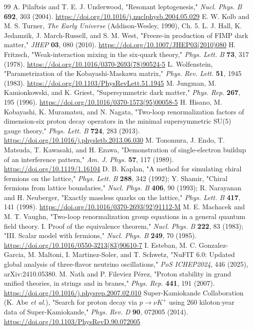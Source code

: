 \documentclass[aps,prd,amsmath,amssymb,superscriptaddress,longbibliography,floatfix,preprint]{revtex4-2}
\begin{document}
\begin{thebibliography}{99}
 A. Pilaftsis and T. E. J. Underwood, "Resonant leptogenesis," \emph{Nucl. Phys. B} \textbf{692}, 303 (2004). \url{https://doi.org/10.1016/j.nuclphysb.2004.05.029}
 E. W. Kolb and M. S. Turner, \emph{The Early Universe} (Addison-Wesley, 1990), Ch. 5.
 L. J. Hall, K. Jedamzik, J. March-Russell, and S. M. West, "Freeze-in production of FIMP dark matter," \emph{JHEP} \textbf{03}, 080 (2010). \url{https://doi.org/10.1007/JHEP03(2010)080}
 H. Fritzsch, "Weak-interaction mixing in the six-quark theory," \emph{Phys. Lett. B} \textbf{73}, 317 (1978). \url{https://doi.org/10.1016/0370-2693(78)90524-5}
 L. Wolfenstein, "Parametrization of the Kobayashi-Maskawa matrix," \emph{Phys. Rev. Lett.} \textbf{51}, 1945 (1983). \url{https://doi.org/10.1103/PhysRevLett.51.1945}
 M. Jungman, M. Kamionkowski, and K. Griest, "Supersymmetric dark matter," \emph{Phys. Rep.} \textbf{267}, 195 (1996). \url{https://doi.org/10.1016/0370-1573(95)00058-5}
 H. Hisano, M. Kobayashi, K. Muramatsu, and N. Nagata, "Two-loop renormalization factors of dimension-six proton decay operators in the minimal supersymmetric SU(5) gauge theory," \emph{Phys. Lett. B} \textbf{724}, 283 (2013). \url{https://doi.org/10.1016/j.physletb.2013.06.030}
 M. Tonomura, J. Endo, T. Matsuda, T. Kawasaki, and H. Ezawa, "Demonstration of single-electron buildup of an interference pattern," \emph{Am. J. Phys.} \textbf{57}, 117 (1989). \url{https://doi.org/10.1119/1.16104}
 D. B. Kaplan, "A method for simulating chiral fermions on the lattice," \emph{Phys. Lett. B} \textbf{288}, 342 (1992); Y. Shamir, "Chiral fermions from lattice boundaries," \emph{Nucl. Phys. B} \textbf{406}, 90 (1993); R. Narayanan and H. Neuberger, "Exactly massless quarks on the lattice," \emph{Phys. Lett. B} \textbf{417}, 141 (1998). \url{https://doi.org/10.1016/0370-2693(92)91112-M}
 M. E. Machacek and M. T. Vaughn, "Two-loop renormalization group equations in a general quantum field theory. I. Proof of the equivalence theorem," \emph{Nucl. Phys. B} \textbf{222}, 83 (1983); "III. Scalar model with fermions," \emph{Nucl. Phys. B} \textbf{249}, 70 (1985). \url{https://doi.org/10.1016/0550-3213(83)90610-7}
 I. Esteban, M. C. Gonzalez-Garcia, M. Maltoni, I. Martinez-Soler, and T. Schwetz, "NuFIT 6.0: Updated global analysis of three-flavor neutrino oscillations," \emph{PoS ICHEP2024}, 446 (2025), arXiv:2410.05380.
 M. Nath and P. Fileviez Pérez, "Proton stability in grand unified theories, in strings and in branes," \emph{Phys. Rep.} \textbf{441}, 191 (2007). \url{https://doi.org/10.1016/j.physrep.2007.02.010}
 Super-Kamiokande Collaboration (K. Abe \emph{et al.}), "Search for proton decay via $p\to\nu K^+$ using 260 kiloton$\cdot$year data of Super-Kamiokande," \emph{Phys. Rev. D} \textbf{90}, 072005 (2014).  \url{https://doi.org/10.1103/PhysRevD.90.072005}
\end{thebibliography}
\end{document}
